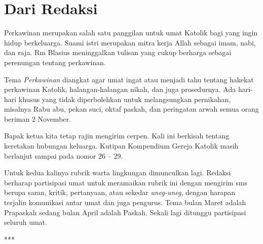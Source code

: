 \newpage

\chapter*{Dari Redaksi}
\small
{}

Perkawinan merupakan salah satu panggilan untuk umat Katolik bagi yang ingin hidup berkeluarga. Suami istri merupakan mitra kerja Allah sebagai imam, nabi, dan raja. Rm Blasius meninggalkan tulisan yang cukup berharga sebagai perenungan tentang perkawinan.

\bigskip

Tema \textit{Perkawinan} diangkat agar umat ingat atau menjadi tahu tentang hakekat perkawinan Katolik, halangan-halangan nikah,  dan juga prosedurnya. Ada hari-hari khusus yang tidak diperbolehkan untuk melangsungkan pernikahan, misalnya Rabu abu, pekan suci, oktaf paskah, dan peringatan arwah semua orang beriman 2 November.
 
\bigskip

Bapak ketua kita tetap rajin mengirim cerpen. Kali ini berkisah tentang keretakan hubungan keluarga.  
Kutipan Kompendium Gereja Katolik masih berlanjut sampai pada nomor 26 -- 29.

\bigskip

Untuk kedua kalinya rubrik warta lingkungan dimunculkan lagi. Redaksi berharap partisipasi umat untuk meramaikan rubrik ini dengan mengirim sms berupa saran, kritik, pertanyaan, atau sekedar \textit{uneg-uneg}, dengan harapan terjalin komunikasi antar umat dan juga pengurus. Tema bulan Maret adalah Prapaskah sedang bulan April adalah Paskah. Sekali lagi ditunggu partisipasi seluruh umat.
\normalsize

\begin{center}***\end{center} 

\vfill




